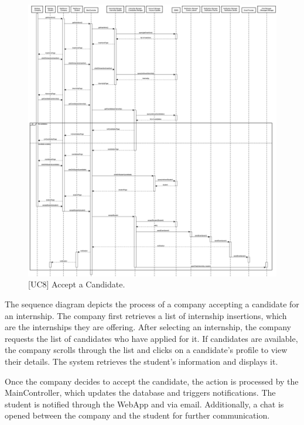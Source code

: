 \begin{figure}[htbp]
    \centering
    \includegraphics[width=\linewidth]{DD/Images/sequenceDiagrams/AcceptCandidate.png}
    \caption{[UC8] Accept a Candidate.}
    \label{fig:acceptCandidate_immagine}
\end{figure}
\clearpage


The sequence diagram depicts the process of a company accepting a candidate for an internship. The company first retrieves a list of internship insertions, which are the internships they are offering. After selecting an internship, the company requests the list of candidates who have applied for it. If candidates are available, the company scrolls through the list and clicks on a candidate's profile to view their details. The system retrieves the student's information and displays it.

Once the company decides to accept the candidate, the action is processed by the MainController, which updates the database and triggers notifications. The student is notified through the WebApp and via email. Additionally, a chat is opened between the company and the student for further communication.

